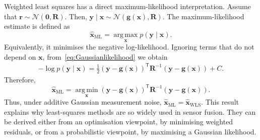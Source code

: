 \documentclass{ieeeaccess}
\begin{document}
Weighted least squares has a direct maximum-likelihood interpretation. Assume that $\mathbf{r}
\sim
\mathcal{N}
\left(
\mathbf{0},
\mathbf{R}
\right)$. Then, $\mathbf{y}\mid\mathbf{x}
\sim
\mathcal{N}
\left(
\mathbf{g}(\mathbf{x}),
\mathbf{R}
\right)$.
The maximum-likelihood estimate is defined as
\begin{equation}
\widehat{\mathbf{x}}_{\mathrm{ML}}
=
\operatorname*{arg\,max}_{\mathbf{x}}
p(\mathbf{y}\mid\mathbf{x}).
\end{equation}
Equivalently, it minimises the negative log-likelihood. Ignoring terms that do not depend on $\mathbf{x}$, from~\eqref{eq:Gaussianlikelihood} we obtain
\begin{align*}
-\log p(\mathbf{y}\mid\mathbf{x}) =
\frac{1}{2}
\left(\mathbf{y} - \mathbf{g}(\mathbf{x}) \right)^{\mathsf T}
\mathbf{R}^{-1}
\left(
\mathbf{y}
-
\mathbf{g}(\mathbf{x})
\right)
+
C.
\end{align*}
Therefore,
\begin{equation}
\widehat{\mathbf{x}}_{\mathrm{ML}}
=
\operatorname*{arg\,min}_{\mathbf{x}}
\left(
\mathbf{y}
-
\mathbf{g}(\mathbf{x})
\right)^{\mathsf T}
\mathbf{R}^{-1}
\left(
\mathbf{y}
-
\mathbf{g}(\mathbf{x})
\right).
\end{equation}
Thus, under additive Gaussian measurement noise, $\widehat{\mathbf{x}}_{\mathrm{ML}} = \widehat{\mathbf{x}}_{\mathrm{WLS}}$. This result explains why least-squares methods are so widely used in sensor fusion. They can be derived either from an optimisation viewpoint, by minimising weighted residuals, or from a probabilistic viewpoint, by maximising a Gaussian likelihood.
\end{document}
